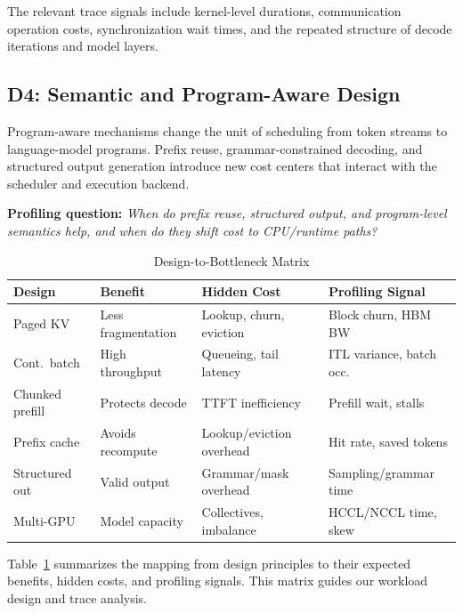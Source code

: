 \documentclass[conference]{IEEEtran}
\begin{document}
The relevant trace signals include kernel-level durations, communication
operation costs, synchronization wait times, and the repeated structure of
decode iterations and model layers.

\subsection{D4: Semantic and Program-Aware Design}

Program-aware mechanisms change the unit of scheduling from token streams to
language-model programs. Prefix reuse, grammar-constrained decoding, and
structured output generation introduce new cost centers that interact with
the scheduler and execution backend.

\textbf{Profiling question:} \emph{When do prefix reuse, structured output,
and program-level semantics help, and when do they shift cost to CPU/runtime
paths?}

\begin{table}[htbp]
\caption{Design-to-Bottleneck Matrix}
\label{tab:design-matrix}
\begin{center}
\small
\begin{tabular}{@{}p{}p{}p{}p{}@{}}
\toprule
\textbf{Design} & \textbf{Benefit} & \textbf{Hidden Cost} & \textbf{Profiling Signal} \\
\midrule
Paged KV      & Less fragmentation  & Lookup, churn, eviction & Block churn, HBM BW \\
Cont.\ batch  & High throughput     & Queueing, tail latency  & ITL variance, batch occ. \\
Chunked prefill & Protects decode   & TTFT inefficiency       & Prefill wait, stalls \\
Prefix cache  & Avoids recompute    & Lookup/eviction overhead & Hit rate, saved tokens \\
Structured out & Valid output       & Grammar/mask overhead   & Sampling/grammar time \\
Multi-GPU     & Model capacity      & Collectives, imbalance  & HCCL/NCCL time, skew \\
\bottomrule
\end{tabular}
\end{center}
\end{table}

Table~\ref{tab:design-matrix} summarizes the mapping from design principles to
their expected benefits, hidden costs, and profiling signals. This matrix
guides our workload design and trace analysis.
\end{document}
